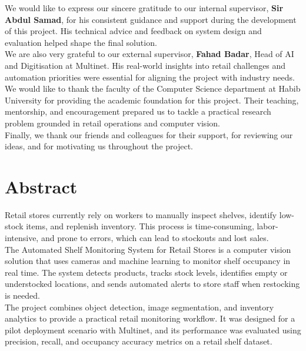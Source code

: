 \documentclass[12pt,twosided]{report}
\begin{document}
We would like to express our sincere gratitude to our internal supervisor, \textbf{Sir Abdul Samad}, for his consistent guidance and support during the development of this project. His technical advice and feedback on system design and evaluation helped shape the final solution.
\\
We are also very grateful to our external supervisor, \textbf{Fahad Badar}, Head of AI and Digitisation at Multinet. His real-world insights into retail challenges and automation priorities were essential for aligning the project with industry needs.
\\
We would like to thank the faculty of the Computer Science department at Habib University for providing the academic foundation for this project. Their teaching, mentorship, and encouragement prepared us to tackle a practical research problem grounded in retail operations and computer vision.
\\
Finally, we thank our friends and colleagues for their support, for reviewing our ideas, and for motivating us throughout the project.

\chapter*{Abstract}

Retail stores currently rely on workers to manually inspect shelves, identify low-stock items, and replenish inventory. This process is time-consuming, labor-intensive, and prone to errors, which can lead to stockouts and lost sales.
\\
The Automated Shelf Monitoring System for Retail Stores is a computer vision solution that uses cameras and machine learning to monitor shelf occupancy in real time. The system detects products, tracks stock levels, identifies empty or understocked locations, and sends automated alerts to store staff when restocking is needed.
\\
The project combines object detection, image segmentation, and inventory analytics to provide a practical retail monitoring workflow. It was designed for a pilot deployment scenario with Multinet, and its performance was evaluated using precision, recall, and occupancy accuracy metrics on a retail shelf dataset.

\pagestyle{fancy}
\tableofcontents
\end{document}
